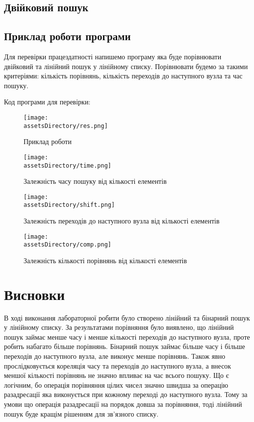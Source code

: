 \newpage
\subsection{Двійковий пошук}



\newpage
\subsection{Приклад роботи програми}
Для перевірки працездатності напишемо програму яка буде порівнювати двійковий та лінійний пошук у лінійному списку.
Порівнювати будемо за такими критеріями:
кількість порівнянь, кількість переходів до наступного вузла та час пошуку.


\noindent
Код програми для перевірки:



\begin{figure}[ht!]
    \centering
    \texttt{[image: \\assetsDirectory/res.png]}
    \caption{Приклад роботи}
\end{figure}

\begin{figure}[ht!]
    \centering
    \texttt{[image: \\assetsDirectory/time.png]}
    \caption{Залежність часу пошуку від кількості елементів}
\end{figure}
\begin{figure}[ht!]
    \centering
    \texttt{[image: \\assetsDirectory/shift.png]}
    \caption{Залежність переходів до наступного вузла від кількості елементів}
\end{figure}
\begin{figure}[ht!]
    \centering
    \texttt{[image: \\assetsDirectory/comp.png]}
    \caption{Залежність кількості порівнянь від кількості елементів}
\end{figure}


\newpage
\section{Висновки}
В ході виконання лабораторної робити було створено лінійний та бінарний пошук у лінійному списку.
За результатами порівняння було виявлено, що лінійний пошук займає менше часу і менше кількості переходів до наступного вузла,
проте робить набагато більше порівнянь.
Бінарний пошук займає більше часу і більше переходів до наступного вузла, але виконує менше порівнянь.
Також явно прослідковується кореляція часу та переходів до наступного вузла,
а внесок меншої кількості порівнянь не значно впливає на час всього пошуку.
Що є логічним, бо операція порівняння цілих чисел значно швидша за операцію разадресації яка виконується при кожному переході до наступного вузла.
Тому за умови що операція разадресації на порядок довша за порівняння, тоді лінійний пошук буде кращім рішенням для зв'язного списку.
